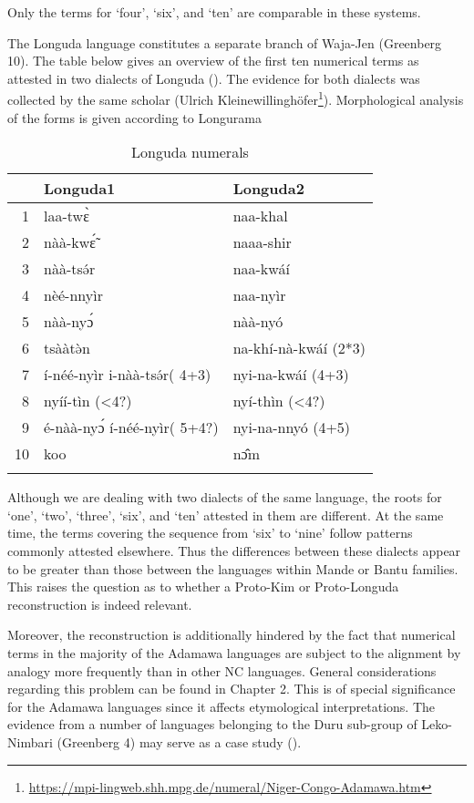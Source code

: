 Only the terms for ‘four’, ‘six’, and ‘ten’ are comparable in these systems. 

The Longuda language constitutes a separate branch of Waja-Jen (Greenberg 10). The table below gives an overview of the first ten numerical terms as attested in two dialects of Longuda (). The evidence for both dialects was collected by the same scholar (Ulrich Kleinewillinghöfer\footnote{\url{https://mpi-lingweb.shh.mpg.de/numeral/Niger-Congo-Adamawa.htm}}). Morphological analysis of the forms is given according to {{Longurama}}

\begin{table}
\caption{\label{tab:3:99}Longuda numerals}


\begin{tabularx}{\textwidth}{rXX} 
\lsptoprule
& {Longuda1} & {Longuda2}\\
\midrule
1 & laa-tw{\`{ɛ}} & naa-khal\\
2 & nàà-kw{\'{\~ɛ}} & naaa-shir\\
3 & nàà-ts{\'{ə}}r & naa-kwáí\\
4 & nèé-nnyìr & naa-nyìr\\
5 & nàà-ny{\'{ɔ}} & nàà-nyó\\
6 & tsààt{\`{ə}}n & na-khí-nà-kwáí (2*3)\\
7 & í-néé-nyìr i-nàà-ts{\'{ə}}r( 4+3) & nyi-na-kwáí (4+3)\\
8 & nyíí-tìn (<4?) & nyí-thìn (<4?)\\
9 & é-nàà-ny{\'{ɔ}} í-néé-nyìr( 5+4?) & nyi-na-nnyó (4+5)\\
10 & koo & n{\^{ɔ}}m\\
\lspbottomrule
\end{tabularx}
\end{table}

Although we are dealing with two dialects of the same language, the roots for ‘one’, ‘two’, ‘three’, ‘six’, and ‘ten’ attested in them are different. At the same time, the terms covering the sequence from ‘six’ to ‘nine’ follow patterns commonly attested elsewhere. Thus the differences between these dialects appear to be greater than those between the languages within Mande or Bantu families. This raises the question as to whether a Proto-Kim or Proto-Longuda reconstruction is indeed relevant.

Moreover, the reconstruction is additionally hindered by the fact that numerical terms in the majority of the Adamawa languages are subject to the alignment by analogy more frequently than in other NC languages. General considerations regarding this problem can be found in Chapter 2. This is of special significance for the Adamawa languages since it affects etymological interpretations. The evidence from a number of languages belonging to the Duru sub-group of Leko-Nimbari (Greenberg 4) may serve as a case study ().

